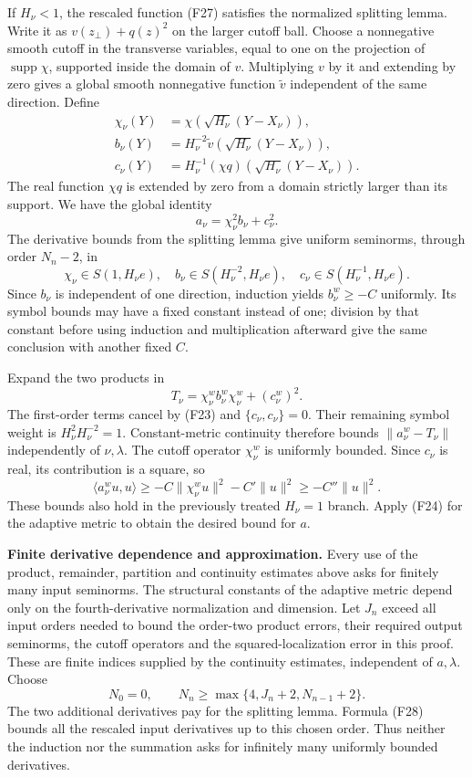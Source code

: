 \documentclass[
  11pt,
]{article}
\begin{document}
If \(H_\nu<1\), the rescaled function (F27) satisfies the normalized
splitting lemma. Write it as \(v(z_\perp)+q(z)^2\) on the larger cutoff
ball. Choose a nonnegative smooth cutoff in the transverse variables,
equal to one on the projection of \(\operatorname{supp}\chi\), supported
inside the domain of \(v\). Multiplying \(v\) by it and extending by
zero gives a global smooth nonnegative function \(\widetilde v\)
independent of the same direction. Define \[
\begin{split}
\chi_\nu(Y)&=\chi(\sqrt{H_\nu}(Y-X_\nu)),\\
b_\nu(Y)&=H_\nu^{-2}\widetilde v(\sqrt{H_\nu}(Y-X_\nu)),\\
c_\nu(Y)&=H_\nu^{-1}(\chi q)(\sqrt{H_\nu}(Y-X_\nu)).
\end{split}
\tag{F32}
\] The real function \(\chi q\) is extended by zero from a domain
strictly larger than its support. We have the global identity \[
a_\nu=\chi_\nu^2b_\nu+c_\nu^2.
\tag{F33}
\] The derivative bounds from the splitting lemma give uniform
seminorms, through order \(N_n-2\), in \[
\chi_\nu\in S(1,H_\nu e),\quad
b_\nu\in S(H_\nu^{-2},H_\nu e),\quad
c_\nu\in S(H_\nu^{-1},H_\nu e).
\tag{F34}
\] Since \(b_\nu\) is independent of one direction, induction yields
\(b_\nu^w\geq-C\) uniformly. Its symbol bounds may have a fixed constant
instead of one; division by that constant before using induction and
multiplication afterward give the same conclusion with another fixed
\(C\).

Expand the two products in \[
T_\nu=\chi_\nu^wb_\nu^w\chi_\nu^w+(c_\nu^w)^2.
\tag{F35}
\] The first-order terms cancel by (F23) and \(\{c_\nu,c_\nu\}=0\).
Their remaining symbol weight is \(H_\nu^2H_\nu^{-2}=1\).
Constant-metric continuity therefore bounds \(\|a_\nu^w-T_\nu\|\)
independently of \(\nu,\lambda\). The cutoff operator \(\chi_\nu^w\) is
uniformly bounded. Since \(c_\nu\) is real, its contribution is a
square, so \[
\langle a_\nu^wu,u\rangle
\geq-C\|\chi_\nu^wu\|^2-C'\|u\|^2
\geq-C''\|u\|^2.
\tag{F36}
\] These bounds also hold in the previously treated \(H_\nu=1\) branch.
Apply (F24) for the adaptive metric to obtain the desired bound for
\(a\).

\textbf{Finite derivative dependence and approximation.} Every use of
the product, remainder, partition and continuity estimates above asks
for finitely many input seminorms. The structural constants of the
adaptive metric depend only on the fourth-derivative normalization and
dimension. Let \(J_n\) exceed all input orders needed to bound the
order-two product errors, their required output seminorms, the cutoff
operators and the squared-localization error in this proof. These are
finite indices supplied by the continuity estimates, independent of
\(a,\lambda\). Choose \[
N_0=0,\qquad N_n\geq\max\{4,J_n+2,N_{n-1}+2\}.
\tag{F37}
\] The two additional derivatives pay for the splitting lemma. Formula
(F28) bounds all the rescaled input derivatives up to this chosen order.
Thus neither the induction nor the summation asks for infinitely many
uniformly bounded derivatives.
\end{document}

